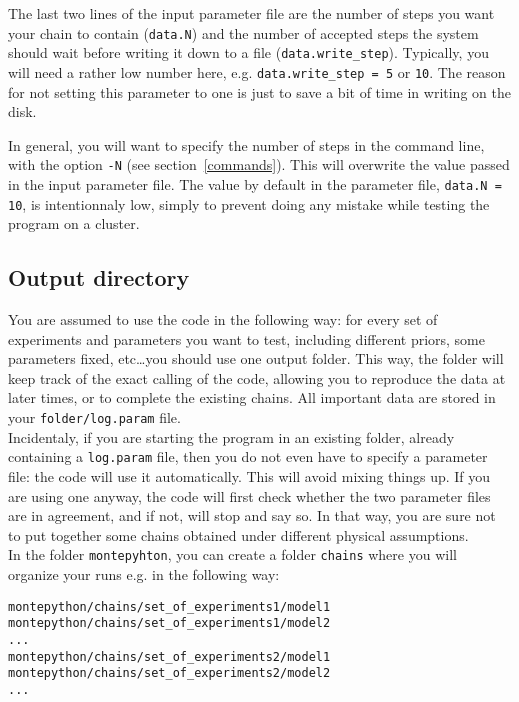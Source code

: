 \documentclass[10pt]{article}
\begin{document}
  The last two lines of the input parameter file are the number of steps you want your chain to contain
  (\verb?data.N?) and the number of accepted steps the system should wait
  before writing it down to a file (\verb?data.write_step?). Typically, you
  will need a rather low number here, e.g. \verb?data.write_step = 5? or \verb?10?. The reason for not setting this parameter to one is just to save a bit of time in writing on the disk.
 
  In general, you will want to specify the number of steps in the command line,
  with the option \verb?-N? (see section~\ref{commands}). This will overwrite the value passed in the input parameter file. The value by default in the parameter file, \verb?data.N = 10?,
  is intentionnaly low, 
  simply to prevent doing any mistake while testing the program on a cluster.


\subsection{Output directory}

You are assumed to use the code in the following way: for every set of
  experiments and parameters you want to test, including different priors, some
  parameters fixed, etc\ldots you should use one output folder. This way, the folder
  will keep track of the exact calling of the code, allowing you to reproduce
  the data at later times, or to complete the existing chains. All 
  important data are stored in your \verb?folder/log.param? file.\\

  Incidentaly, if you are starting the program in an existing folder, already
  containing a \verb?log.param? file, then you do not even have to specify a
  parameter file: the code will use it automatically. This will avoid mixing
  things up. If you are using one anyway, the code will first check whether the
  two parameter files are in agreement, and if not, will stop and say so. In that way, you are sure not to put together some chains obtained under different physical assumptions.\\
  
  In the folder \verb?montepyhton?, you can create a folder \verb?chains? where you will organize your runs e.g. in the following way:
    \begin{alltt}
    montepython/chains/set_of_experiments1/model1
    montepython/chains/set_of_experiments1/model2
    ...
    montepython/chains/set_of_experiments2/model1
    montepython/chains/set_of_experiments2/model2    
    ...
  \end{alltt}
  
\end{document}
